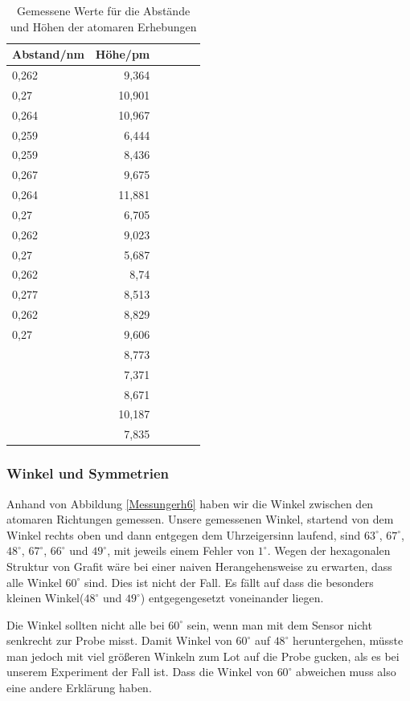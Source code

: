 \documentclass[10pt,a4paper]{article}
\begin{document}
\begin{table}[h!]
	\centering
	\begin{tabular}{|l|r|c|lrp{16cm}}\hline
		Abstand/nm & Höhe/pm\\\hline
		0,262 & 9,364 \\
		0,27 & 10,901 \\
		0,264 & 10,967\\
		0,259& 6,444 \\
		0,259 & 8,436 \\
		0,267 & 9,675 \\
		0,264 & 11,881\\
		0,27 & 6,705\\
		0,262 & 9,023\\
		0,27 & 5,687\\
		0,262 & 8,74\\
		0,277 & 8,513\\
		0,262 & 8,829\\
		0,27 & 9,606\\
		& 8,773\\
		& 7,371\\
		& 8,671\\
		& 10,187\\
		& 7,835\\
		\hline
	\end{tabular}
	\caption{Gemessene Werte für die Abstände und Höhen der atomaren Erhebungen}
	\label{Messungerh5}
\end{table}

\subsubsection{Winkel und Symmetrien} \label{winkelsec}

Anhand von Abbildung \ref{Messungerh6} haben wir die Winkel zwischen den atomaren Richtungen gemessen. Unsere gemessenen Winkel, startend von dem Winkel rechts oben und dann entgegen dem Uhrzeigersinn laufend, sind $63^\circ$, $67^\circ$, $48^\circ$, $67^\circ$, $66^\circ$ und $49^\circ$, mit jeweils einem Fehler von $1^\circ$. Wegen der hexagonalen Struktur von Grafit wäre bei einer naiven Herangehensweise zu erwarten, dass alle Winkel $60^\circ$ sind. Dies ist nicht der Fall. Es fällt auf dass die besonders kleinen Winkel($48^\circ$ und $49^\circ$) entgegengesetzt voneinander liegen. 

Die Winkel sollten nicht alle bei $60^\circ$ sein, wenn man mit dem Sensor nicht senkrecht zur Probe misst. Damit Winkel von $60^\circ$ auf $48^\circ$ heruntergehen, müsste man jedoch mit viel größeren Winkeln zum Lot auf die Probe gucken, als es bei unserem Experiment der Fall ist. Dass die Winkel von $60^\circ$ abweichen muss also eine andere Erklärung haben.
\end{document}

